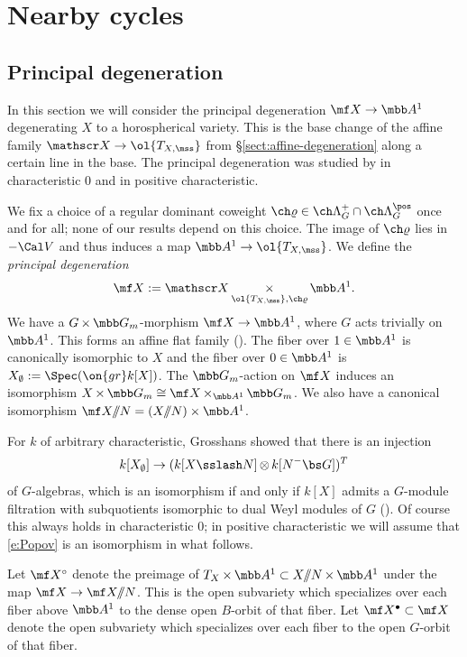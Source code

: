 \documentclass[final]{amsart}
\theoremstyle{remark}
\theoremstyle{definition}
\DeclareMathOperator*{\ot}{\otimes}
\DeclareMathOperator*{\xt}{\times}
\numberwithin{equation}{section}
\begin{document}
\section{Nearby cycles} \label{sect:nearby}

\subsection{Principal degeneration} \label{sect:degeneration}

In this section we will consider the principal degeneration $\mf X \to \mbb A^1$ 
degenerating $X$ to a horospherical variety. This is the base change of
the affine family $\mathscr X \to \ol{T_{X,\mss}}$ from \S\ref{sect:affine-degeneration}
along a certain line in the base. The principal degeneration 
was studied by \cite{Pop86} in characteristic $0$ and \cite{Grosshans92} in positive
characteristic.

We fix a choice of 
a regular dominant coweight $\ch\varrho \in \ch\Lambda^+_G \cap \ch\Lambda^\pos_G$
once and for all; none of our results depend on this choice. 
The image of $\ch\varrho$ lies in $-\Cal V$
and thus induces a map $\mbb A^1 \to \ol{T_{X,\mss}}$. 
We define the \emph{principal degeneration} 
\[ \mf X := \mathscr X \xt_{\ol{T_{X,\mss}}, \ch\varrho} \mbb A^1. \]  
We have a $G \xt \mbb G_m$-morphism 
$\mf X \to \mbb A^1$, where $G$ acts trivially on $\mbb A^1$. 
This forms an affine flat family (\cite[Proposition 9]{Pop86}). 
The fiber over $1 \in \mbb A^1$ is canonically isomorphic to 
$X$ and the fiber over $0\in \mbb A^1$ is $X_\emptyset := \Spec(\on{gr} k[X])$. 
The $\mbb G_m$-action on $\mf X$ induces an isomorphism 
$X \xt \mbb G_m \cong \mf X \xt_{\mbb A^1} \mbb G_m$. 
We also have a canonical isomorphism 
$\mf X /\!\!/ N = (X/\!\!/N) \times \mbb A^1$.

For $k$ of arbitrary characteristic, Grosshans showed that 
there is an injection 
\begin{equation}\label{e:Popov}
    k[X_\emptyset] \to (k[X\sslash N] \ot k[N^-\bs G])^T 
\end{equation}
of $G$-algebras, which is an isomorphism 
if and only if $k[X]$ admits a $G$-module filtration with subquotients
isomorphic to dual Weyl modules of $G$ (\cite[Theorems 8, 16]{Grosshans92}). 
Of course this always holds in characteristic $0$; in positive characteristic 
we will assume that \eqref{e:Popov} is an isomorphism in what follows.

Let $\mf X^\circ$ denote the preimage of $T_X \xt \mbb A^1 \subset X/\!\!/N \xt \mbb A^1$
under the map $\mf X \to \mf X/\!\!/N$. This is the 
open subvariety which specializes 
over each fiber above $\mbb A^1$ to the dense open $B$-orbit of 
that fiber. 
Let $\mf X^\bullet \subset \mf X$ denote the open subvariety which specializes
over each fiber to the open $G$-orbit of that fiber.
\end{document}
